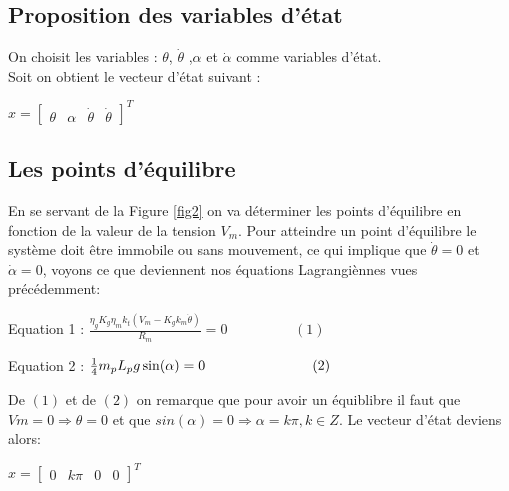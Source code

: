 \documentclass[12pt, a4paper, openany]{report}
\begin{document}
 \subsection{Proposition des variables d'état}

 On choisit les variables :\hspace{1mm} $\theta$, $\dot{\theta}$  ,$\alpha$  et $\dot{\alpha}$ comme variables d'état.\\
 Soit on obtient le vecteur d'état suivant :\\
 \begin{center}
 $x = 
  \begin{bmatrix}
  \theta & \alpha & \dot{\theta} & \dot{\theta}
  \end{bmatrix}^{T}$ 
 \end{center}
 
 \subsection{Les points d'équilibre}
 
 En se servant de la Figure \ref{fig2} on va déterminer les points d'équilibre en fonction de la valeur de la tension $V_{m}$. Pour atteindre un point d'équilibre le système doit être immobile ou sans mouvement, ce qui implique que $\dot{\theta} = 0$ et $\dot{\alpha} = 0$, voyons ce que deviennent nos équations Lagrangiènnes vues précédemment:\\
  \begin{center}
Equation 1 :\hspace{1mm} $\frac{\eta_{g}K_{g}\eta_{m}k_{t}(V_{m}- K_{g}k_{m}\dot{\theta})}{R_{m}} = 0	\hspace{2cm}	(1)$ 
  \end{center}
  
  \begin{center}
Equation 2 :\hspace{1mm} $\frac{1}{4}m_{p}L_{p}g\sin(\alpha) = 0	\hspace{2.7cm}	(2)$ 
  \end{center}
   
De $(1)$ et de $(2)$ on remarque que pour avoir un équiblibre il faut que $V{m} = 0 \Rightarrow \theta = 0$ et que $sin(\alpha) = 0 \Rightarrow \alpha = k\pi, k \in Z .$ Le vecteur d'état deviens alors:\\



\begin{center}
 $x = 
  \begin{bmatrix}
  0 & k\pi & 0 & 0
  \end{bmatrix}^{T}$ 
 \end{center}
 
\end{document}
